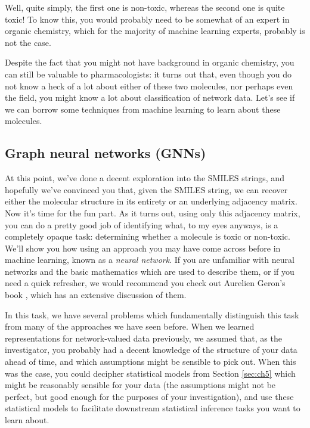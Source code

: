 Well, quite simply, the first one is non-toxic, whereas the second one is quite toxic! To know this, you would probably need to be somewhat of an expert in organic chemistry, which for the majority of machine learning experts, probably is not the case.

Despite the fact that you might not have background in organic chemistry, you can still be valuable to pharmacologists: it turns out that, even though you do not know a heck of a lot about either of these two molecules, nor perhaps even the field, you might know a lot about classification of network data. Let's see if we can borrow some techniques from machine learning to learn about these molecules.

\subsection{Graph neural networks (GNNs)}

At this point, we've done a decent exploration into the SMILES strings, and hopefully we've convinced you that, given the SMILES string, we can recover either the molecular structure in its entirety or an underlying adjacency matrix. Now it's time for the fun part. As it turns out, using only this adjacency matrix, you can do a pretty good job of identifying what, to my eyes anyways, is a completely opaque task: determining whether a molecule is toxic or non-toxic. We'll show you how using an approach you may have come across before in machine learning, known as a \textit{neural network}. If you are unfamiliar with neural networks and the basic mathematics which are used to describe them, or if you need a quick refresher, we would recommend you check out Aurelien Geron's book \cite{Geron2017Mar}, which has an extensive discussion of them.

In this task, we have several problems which fundamentally distinguish this task from many of the approaches we have seen before. When we learned representations for network-valued data previously, we assumed that, as the investigator, you probably had a decent knowledge of the structure of your data ahead of time, and which assumptions might be sensible to pick out. When this was the case, you could decipher statistical models from Section \ref{sec:ch5} which might be reasonably sensible for your data (the assumptions might not be perfect, but good enough for the purposes of your investigation), and use these statistical models to facilitate downstream statistical inference tasks you want to learn about. 

